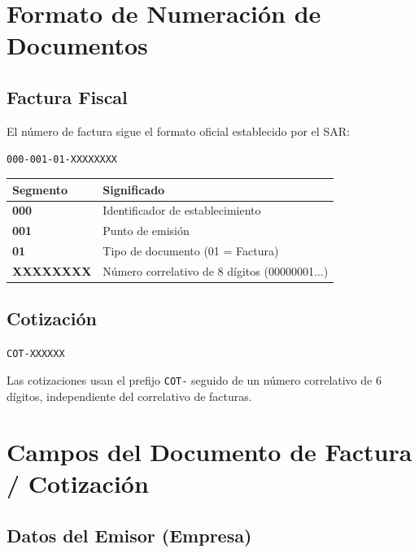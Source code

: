 \documentclass[12pt, letterpaper]{article}
\begin{document}
\section{Formato de Numeración de Documentos}

\subsection{Factura Fiscal}

El número de factura sigue el formato oficial establecido por el SAR:

\begin{center}
  \Large\texttt{000-001-01-XXXXXXXX}
\end{center}

\begin{tabularx}{\linewidth}{>{\ttfamily\bfseries}l X}
  \toprule
  Segmento   & Significado                                       \\
  \midrule
  000        & Identificador de establecimiento                  \\
  001        & Punto de emisión                                  \\
  01         & Tipo de documento (01 = Factura)                  \\
  XXXXXXXX   & Número correlativo de 8 dígitos (00000001$\ldots$)\\
  \bottomrule
\end{tabularx}

\subsection{Cotización}

\begin{center}
  \Large\texttt{COT-XXXXXX}
\end{center}

Las cotizaciones usan el prefijo \texttt{COT-} seguido de un número
correlativo de 6 dígitos, independiente del correlativo de facturas.

\section{Campos del Documento de Factura / Cotización}

\subsection{Datos del Emisor (Empresa)}
\end{document}
